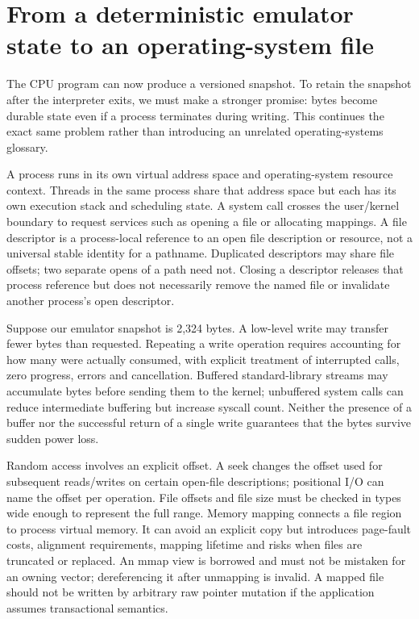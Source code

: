 \section{From a deterministic emulator state to an operating-system file}\label{01-foundations-i-ch016-from-a-deterministic-emulator-state-to-an-operating-system-file}

\hypertarget{01-foundations-i-ch016-from-a-deterministic-emulator-state-to-an-operating-system-file}{}

The CPU program can now produce a versioned snapshot. To retain the snapshot after the interpreter exits, we must make a stronger promise: bytes become durable state even if a process terminates during writing. This continues the exact same problem rather than introducing an unrelated operating-systems glossary.

A process runs in its own virtual address space and operating-system resource context. Threads in the same process share that address space but each has its own execution stack and scheduling state. A system call crosses the user/kernel boundary to request services such as opening a file or allocating mappings. A file descriptor is a process-local reference to an open file description or resource, not a universal stable identity for a pathname. Duplicated descriptors may share file offsets; two separate opens of a path need not. Closing a descriptor releases that process reference but does not necessarily remove the named file or invalidate another process's open descriptor.

Suppose our emulator snapshot is 2,324 bytes. A low-level write may transfer fewer bytes than requested. Repeating a write operation requires accounting for how many were actually consumed, with explicit treatment of interrupted calls, zero progress, errors and cancellation. Buffered standard-library streams may accumulate bytes before sending them to the kernel; unbuffered system calls can reduce intermediate buffering but increase syscall count. Neither the presence of a buffer nor the successful return of a single write guarantees that the bytes survive sudden power loss.

Random access involves an explicit offset. A seek changes the offset used for subsequent reads/writes on certain open-file descriptions; positional I/O can name the offset per operation. File offsets and file size must be checked in types wide enough to represent the full range. Memory mapping connects a file region to process virtual memory. It can avoid an explicit copy but introduces page-fault costs, alignment requirements, mapping lifetime and risks when files are truncated or replaced. An mmap view is borrowed and must not be mistaken for an owning vector; dereferencing it after unmapping is invalid. A mapped file should not be written by arbitrary raw pointer mutation if the application assumes transactional semantics.

